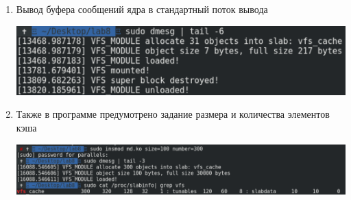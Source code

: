 \documentclass[a4paper,14pt]{extreport} %
\begin{document}
\begin{enumerate}
\item Вывод буфера сообщений ядра в стандартный поток вывода

\includegraphics[scale=0.8]{7}

\item Также в программе предумотрено задание размера и количества элементов кэша

\includegraphics[scale=0.5]{8}

\end{enumerate}
\end{document}

